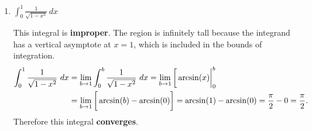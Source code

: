 \documentclass[10pt]{article}
\newenvironment{red}{\color{red}}{\ignorespacesafterend}
\begin{document}
\begin{enumerate}[leftmargin=0pt]
\begin{enumerate}
    \begin{red}
    This integral is sneakily \textbf{improper} because the integrand has a vertical asymptote at $\pi/2$, which is included in the bounds of integration, so the region is infinitely tall. If you happen to remember that $\int\tan(x)\, dx = \ln|\cos(x)| +C$, you could use that fact, but let's do it by substitution because that's more fun:
    \begin{align*}
        \int_0^{\pi/2} \tan(x)\ dx 
        &= \int_0^{\pi/2} \frac{\sin(x)}{\cos(x)}\ dx 
        = \lim_{b\to \pi/2}\int_0^b\frac{\sin(x)}{\cos(x)}\ dx
        \intertext{So let's substitute $u = \cos(x)$, $du = \sin(x)\ dx$:}
        &= \lim_{b\to \pi/2}\int_{x=0}^{x=b} \frac{1}{u}\ du 
        = \left.\lim_{b\to \pi/2} \ln|u| \right|_{x=0}^{x=b}
        = \left.\lim_{b\to \pi/2} \ln|\cos(x)| \right|_0^b \\
        &= \lim_{b\to \pi/2} \left(\vphantom\int \ln|\cos(b)| - \ln|\cos(0)|\right)
        = \lim_{b\to \pi/2} \left(\vphantom\int\ln|\cos(b)| - \ln(1)\right) \\
        &= \lim_{b\to \pi/2} \left(\vphantom\int \ln|\cos(b)| - 0\right)
    \end{align*}
    And now we see a problem: as $b\to \pi/2$, $\cos(b) \to 0$, and so $\ln|\cos(b)| \to -\infty$. Therefore this integral \textbf{diverges}.
    \end{red}
    \item $\displaystyle \int_0^1 \frac{1}{\sqrt{1-x^2}} \, dx$
    
    \begin{red}
    This integral is \textbf{improper}. The region is infinitely tall because the integrand has a vertical asymptote at $x=1$, which is included in the bounds of integration. 
    \begin{align*}
        \int_0^1\frac{1}{\sqrt{1-x^2}}\ dx 
        &= \lim_{b\to 1} \int_0^b \frac{1}{\sqrt{1-x^2}}\ dx = \lim_{b\to 1}\left[\vphantom\int \arcsin(x)\right|_0^b \\
        &= \lim_{b\to 1} \left[\vphantom\int \arcsin(b) - \arcsin(0) \right] 
        = \arcsin(1) - \arcsin(0) = \frac{\pi}{2} - 0 = \frac{\pi}{2}.
    \end{align*}
    Therefore this integral \textbf{converges}.
    \end{red}
\end{enumerate}

\end{enumerate}
\end{document}
